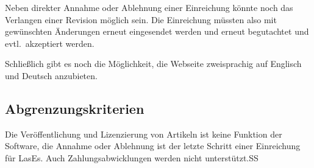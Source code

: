 Neben direkter Annahme oder Ablehnung einer Einreichung könnte noch das Verlangen einer Revision möglich sein.
Die Einreichung müssten also mit gewünschten Änderungen erneut eingesendet werden und erneut begutachtet und evtl.\ akzeptiert werden.

Schließlich gibt es noch die Möglichkeit, die Webseite zweisprachig auf Englisch und Deutsch anzubieten.

\subsection{Abgrenzungskriterien}

Die Veröffentlichung und Lizenzierung von Artikeln ist keine Funktion der Software, die Annahme oder Ablehnung ist der letzte Schritt einer Einreichung für LasEs. Auch Zahlungsabwicklungen werden nicht unterstützt.SS
